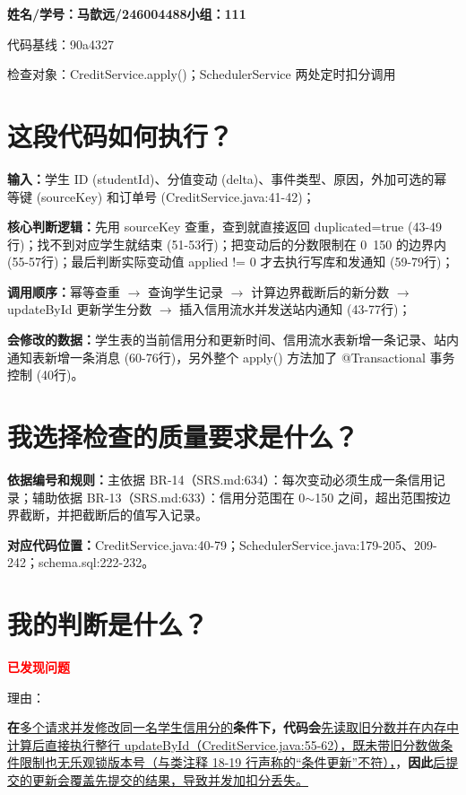 \documentclass[a4paper,11pt,UTF8]{ctexart}
\newcommand{\song}{\CJKfamily{song}}
\newcommand{\sihao}{\fontsize{14bp}{21bp}\selectfont}        %
\newcommand{\xiaosihao}{\fontsize{12bp}{20bp}\selectfont}       %
\begin{document}
\xiaosihao\song
{\sihao\bfseries 姓名/学号：马歆远/246004488\qquad 小组：111

代码基线：90a4327

检查对象：CreditService.apply()；SchedulerService 两处定时扣分调用
}

\section{这段代码如何执行？}
\textbf{输入：}学生 ID (studentId)、分值变动 (delta)、事件类型、原因，外加可选的幂等键 (sourceKey) 和订单号 (CreditService.java:41-42)；

\textbf{核心判断逻辑：}先用 sourceKey 查重，查到就直接返回 duplicated=true (43-49行)；找不到对应学生就结束 (51-53行)；把变动后的分数限制在 0~150 的边界内 (55-57行)；最后判断实际变动值 applied != 0 才去执行写库和发通知 (59-79行)；

\textbf{调用顺序：}幂等查重 $\rightarrow$ 查询学生记录 $\rightarrow$ 计算边界截断后的新分数 $\rightarrow$ updateById 更新学生分数 $\rightarrow$ 插入信用流水并发送站内通知 (43-77行)；

\textbf{会修改的数据：}学生表的当前信用分和更新时间、信用流水表新增一条记录、站内通知表新增一条消息 (60-76行)，另外整个 apply() 方法加了 @Transactional 事务控制 (40行)。

\section{我选择检查的质量要求是什么？}
{\bfseries 依据编号和规则：}主依据 BR-14（SRS.md:634）：每次变动必须生成一条信用记录；辅助依据 BR-13（SRS.md:633）：信用分范围在 0$\sim$150 之间，超出范围按边界截断，并把截断后的值写入记录。

{\bfseries 对应代码位置：}CreditService.java:40-79；SchedulerService.java:179-205、209-242；schema.sql:222-232。

\section{我的判断是什么？}
\textcolor{red}{\bfseries 已发现问题}

理由：

{\bfseries 在}\uline{多个请求并发修改同一名学生信用分的}{\bfseries 条件下，代码会}\uline{先读取旧分数并在内存中计算后直接执行整行 updateById（CreditService.java:55-62），既未带旧分数做条件限制也无乐观锁版本号（与类注释 18-19 行声称的“条件更新”不符），}{，\bfseries 因此}\uline{后提交的更新会覆盖先提交的结果，导致并发加扣分丢失。}
\end{document}
